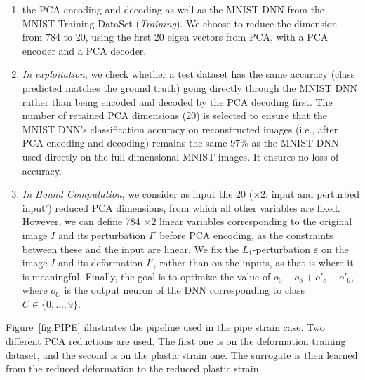 \begin{enumerate}
\item the PCA encoding and decoding as well as the MNIST DNN from the MNIST Training DataSet ({\em Training}).
We choose to reduce the dimension from 784 to 20, using the first 20 eigen vectors from PCA, with a PCA encoder and a PCA decoder.

\item {\em In exploitation}, we check whether a test dataset has the same accuracy (class predicted matches the ground truth) 
going directly through the MNIST DNN rather than being encoded and decoded by the PCA decoding first.
The number of retained PCA dimensions (20) is selected to ensure that the MNIST DNN's classification accuracy on reconstructed images (i.e., after PCA encoding and decoding) remains the same $97$\% as the MNIST DNN used directly on the full-dimensional MNIST images.
It ensures no loss of accuracy.
%
\item {\em In Bound Computation}, we consider as input the 20 ($\times 2$: input and perturbed input') reduced PCA dimensions, from which all other variables are fixed.
However, we can define 784 $\times 2$ linear variables corresponding to the original image $I$ and its perturbation $I'$ before PCA encoding, as the constraints between these and the input are linear.
We fix the $L_1$-perturbation $\varepsilon$ on the image $I$ and its deformation $I'$, rather than on the inputs, as that is where it is meaningful.
Finally, the goal is to optimize the value of $o_6 -o_8+ o'_8 - o'_6$,  where $o_C$ is the output neuron of the DNN corresponding to class $C \in \{0,\ldots, 9\}$.
\end{enumerate}

%
%

\newpage


Figure~\ref{fig.PIPE} illustrates the pipeline used in the pipe strain case. 
Two different PCA reductions are used. The first one is on the deformation training dataset, 
and the second is on the plastic strain one.
%
The surrogate is then learned from the reduced deformation to the reduced plastic strain. 
%

